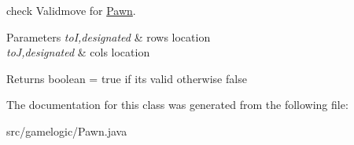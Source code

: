 check Validmove for \mbox{\hyperlink{classgamelogic_1_1_pawn}{Pawn}}. 
\begin{DoxyParams}{Parameters}
{\em toI,designated} & row\textquotesingle{}s location \\
\hline
{\em toJ,designated} & col\textquotesingle{}s location \\
\hline
\end{DoxyParams}
\begin{DoxyReturn}{Returns}
boolean = true if it\textquotesingle{}s valid otherwise false 
\end{DoxyReturn}


The documentation for this class was generated from the following file\+:\begin{DoxyCompactItemize}
\item 
src/gamelogic/Pawn.\+java\end{DoxyCompactItemize}
